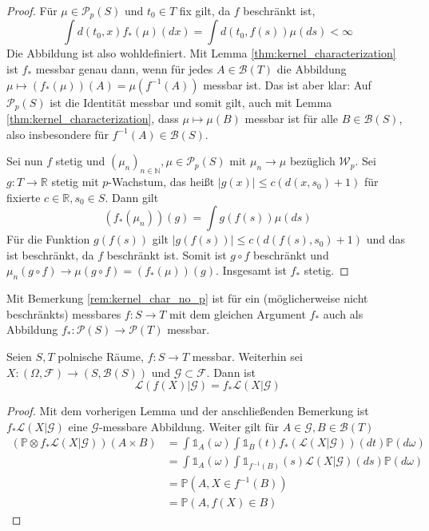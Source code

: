 \begin{proof}
Für $\mu \in \mathcal{P}_p(S)$ und $t_0 \in T$ fix gilt, da $f$ beschränkt ist,
$$\int d(t_0, x) f_*(\mu)(dx) = \int d(t_0, f(s))\mu(ds) < \infty$$
Die Abbildung ist also wohldefiniert.
Mit Lemma \ref{thm:kernel_characterization} ist $f_*$ messbar genau dann, wenn für jedes $A \in \mathcal{B}(T)$ die Abbildung $\mu \mapsto (f_*(\mu))(A)=\mu(f^{-1}(A))$ messbar ist. Das ist aber klar: Auf $\mathcal{P}_p(S)$ ist die Identität messbar und somit gilt, auch mit Lemma \ref{thm:kernel_characterization}, dass $\mu \mapsto \mu(B)$ messbar ist für alle $B\in \mathcal{B}(S)$, also insbesondere für $f^{-1}(A) \in \mathcal{B}(S)$. 

Sei nun $f$ stetig und $(\mu_n)_{n\in\mathbb{N}}, \mu \in \mathcal{P}_p(S)$ mit $\mu_n\rightarrow \mu$ bezüglich $\mathcal{W}_p$. Sei $g:T\rightarrow \mathbb{R}$ stetig mit $p$-Wachstum, das heißt $|g(x)| \leq c(d(x, s_0)+1)$ für fixierte $c\in\mathbb{R}, s_0\in S$. Dann gilt
    $$(f_*(\mu_n))(g) = \int g(f(s)) \mu(ds)$$
Für die Funktion $g(f(s))$ gilt $|g(f(s))|\leq c(d(f(s), s_0)+1)$ und das ist beschränkt, da $f$ beschränkt ist. Somit ist $g\circ f$ beschränkt und $\mu_n(g\circ f) \rightarrow \mu(g\circ f) = (f_*(\mu))(g)$. Insgesamt ist $f_*$ stetig.
\end{proof}
\begin{remark}
Mit Bemerkung \ref{rem:kernel_char_no_p} ist für ein (möglicherweise nicht beschränkts) messbares $f: S\rightarrow T$ mit dem gleichen Argument $f_*$ auch als Abbildung $f_*: \mathcal{P}(S) \rightarrow \mathcal{P}(T)$ messbar.
\end{remark}
\begin{corollary}\label{thm:pushforward_law}
Seien $S, T$ polnische Räume, $f:S\rightarrow T$ messbar. Weiterhin sei $X:(\Omega, \mathcal{F}) \rightarrow (S, \mathcal{B}(S))$ und $\mathcal{G}\subset\mathcal{F}$. Dann ist 
$$\mathcal{L}(f(X)\vert \mathcal{G}) = f_*\mathcal{L}(X\vert\mathcal{G})$$
\end{corollary}
\begin{proof}
Mit dem vorherigen Lemma und der anschließenden Bemerkung ist $f_*\mathcal{L}(X\vert\mathcal{G})$ eine $\mathcal{G}$-messbare Abbildung. Weiter gilt für $A\in\mathcal{G}, B\in\mathcal{B}(T)$
\begin{align*}
    (\mathbb{P}\otimes f_*\mathcal{L}(X\vert \mathcal{G}))(A\times B) &= \int \mathds{1}_A(\omega) \int \mathds{1}_B(t) f_*(\mathcal{L}(X\vert\mathcal{G}))(dt) \mathbb{P}(d\omega) \\
    &= \int \mathds{1}_A(\omega) \int \mathds{1}_{f^{-1}(B)}(s)\mathcal{L}(X\vert\mathcal{G})(ds) \mathbb{P}(d\omega) \\
    &= \mathbb{P}(A, X\in f^{-1}(B)) \\
    &= \mathbb{P}(A, f(X) \in B)
\end{align*}
\end{proof}
